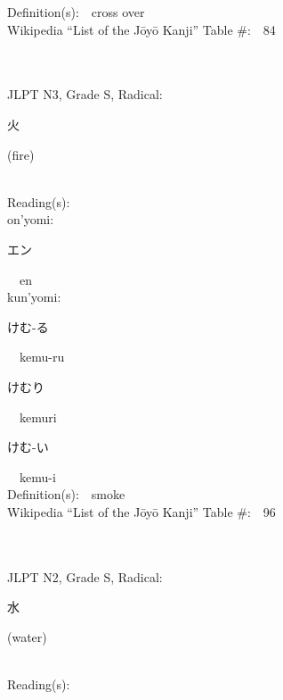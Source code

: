 \begin{multicols}{2}
Definition(s):\ \ cross over \\
Wikipedia ``List of the J\=oy\=o Kanji'' Table \#:\ \ 84 \\
\ \ \\
{\fontsize{34pt}{40pt}  }\ \ \\  %
{JLPT N3, Grade S, Radical:\ \ {\begin{CJK}{UTF8}{min} 火 \end{CJK}} (fire) } \\
Reading(s):\ \ \\
{\hspace*{1em}}on'yomi:\ \ \\
{\hspace*{2em}}{\begin{CJK}{UTF8}{min} エン \end{CJK}}\ \ en\ \ \\
{\hspace*{1em}}kun'yomi:\ \ \\
{\hspace*{2em}}{\begin{CJK}{UTF8}{min} けむ-る \end{CJK}}\ \ kemu-ru\ \ \\
{\hspace*{2em}}{\begin{CJK}{UTF8}{min} けむり \end{CJK}}\ \ kemuri\ \ \\
{\hspace*{2em}}{\begin{CJK}{UTF8}{min} けむ-い \end{CJK}}\ \ kemu-i\ \ \\
Definition(s):\ \ smoke \\
Wikipedia ``List of the J\=oy\=o Kanji'' Table \#:\ \ 96 \\
\ \ \\
{\fontsize{34pt}{40pt}  }\ \ \\  %
{JLPT N2, Grade S, Radical:\ \ {\begin{CJK}{UTF8}{min} 水 \end{CJK}} (water) } \\
Reading(s):\ \ \\

\end{multicols}
